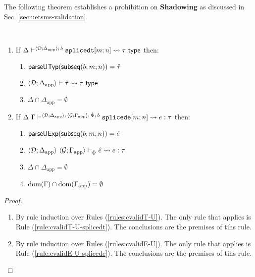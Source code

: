 The following theorem establishes a prohibition on \textbf{Shadowing} as discussed in Sec. \ref{sec:uetsms-validation}.
\begingroup
\def\thetheorem{\ref{thm:shadowing-prohibition-SES}}
\begin{theorem} ~
\begin{enumerate}
\item If $\Delta\vdash^{\langle \mathcal{D}; \Delta_\text{app} \rangle;\,b} \texttt{splicedt}[m; n] \leadsto \tau~\mathsf{type}$ then:\begin{enumerate}
\item $\mathsf{parseUTyp}(\mathsf{subseq}(b; m; n))={\hat\tau}$
\item $\langle \mathcal{D}; \Delta_\text{app} \rangle \vdash {\hat\tau} \leadsto \tau~\mathsf{type}$
\item $\Delta \cap \Delta_\text{app} = \emptyset$
\end{enumerate}
\item If $\Delta~\Gamma\vdash^{\langle \mathcal{D}; \Delta_\text{app} \rangle;\,\langle \mathcal{G}; \Gamma_\text{app} \rangle;\,\hat{\Psi};\,b} \texttt{splicede}[m; n] \leadsto e : \tau$ then:
\begin{enumerate}
\item $\mathsf{parseUExp}(\mathsf{subseq}(b; m; n))={\hat e}$
\item $\langle \mathcal{D}; \Delta_\text{app} \rangle~\langle \mathcal{G}; \Gamma_\text{app} \rangle \vdash_{\hat{\Psi}} {\hat e} \leadsto e : \tau$
\item $\Delta \cap \Delta_\text{app} = \emptyset$
\item $\text{dom}(\Gamma) \cap \text{dom}(\Gamma_\text{app}) = \emptyset$
\end{enumerate}
\end{enumerate}
\end{theorem}
\begin{proof} ~
\begin{enumerate}
\item By rule induction over Rules (\ref{rules:cvalidT-U}). The only rule that applies is Rule (\ref{rule:cvalidT-U-splicedt}). The conclusions are the premises of tihs rule.
\item By rule induction over Rules (\ref{rules:cvalidE-U}). The only rule that applies is Rule (\ref{rule:cvalidE-U-splicede}). The conclusions are the premises of tihs rule.
\end{enumerate}
\end{proof}
\endgroup
